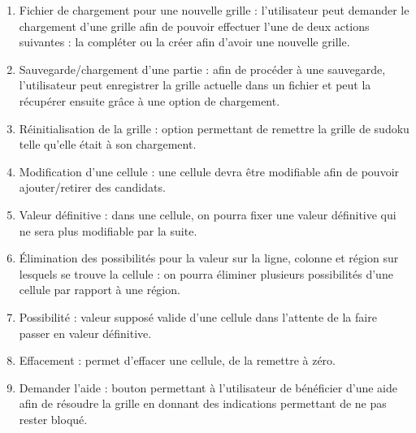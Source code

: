 \begin{enumerate}
  
  \item Fichier de chargement pour une nouvelle grille :
  l'utilisateur peut demander le chargement d'une grille afin 
  de pouvoir effectuer l'une de deux actions suivantes : 
  la compléter ou la créer afin d'avoir une nouvelle grille. \\
  
  \item Sauvegarde/chargement d’une partie :
  afin de procéder à une sauvegarde, l'utilisateur peut enregistrer la grille actuelle 
  dans un fichier et peut la récupérer ensuite grâce à une option de chargement. \\
  
  \item Réinitialisation de la grille :
  option permettant de remettre la grille de sudoku telle qu'elle était à son chargement. \\
  
  \item Modification d’une cellule :
  une cellule devra être modifiable afin de pouvoir ajouter/retirer des candidats. \\
  
  \item Valeur définitive :
  dans une cellule, on pourra fixer une valeur définitive qui ne sera plus modifiable par la suite. \\
  
  \item Élimination des possibilités pour la valeur sur la ligne, colonne et
  région sur lesquels se trouve la cellule :
  on pourra éliminer plusieurs possibilités d'une cellule par rapport à une région. \\
  
  \item Possibilité : valeur supposé valide d'une cellule dans l'attente de la faire passer en valeur définitive. \\
  
  \item Effacement : permet d'effacer une cellule, de la remettre à zéro. \\
  
  \item Demander l’aide : bouton permettant à l'utilisateur de bénéficier d'une aide 
  afin de résoudre la grille en donnant des indications permettant de ne pas rester bloqué. \\
  

\end{enumerate}

